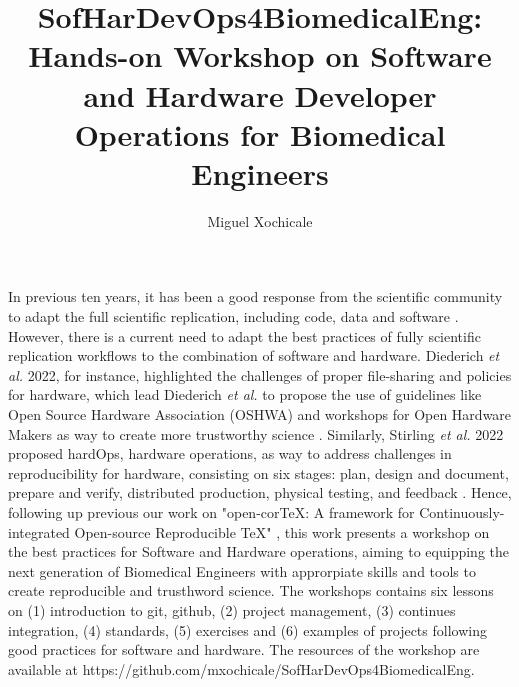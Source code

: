 \documentclass{article}
\title{
SofHarDevOps4BiomedicalEng: Hands-on Workshop on Software and Hardware Developer Operations for Biomedical Engineers %
}
\author{Miguel Xochicale}
\date{\DTMNow}
\begin{document}
\maketitle
In previous ten years, it has been a good response from the scientific community to adapt the full scientific replication, including code, data and software \cite{peng2011}. 
However, there is a current need to adapt the best practices of fully scientific replication workflows to the combination of software and hardware.
Diederich \textit{et al.} 2022, for instance, highlighted the challenges of proper file-sharing and policies for hardware, which lead Diederich \textit{et al.} to propose the use of guidelines like Open Source Hardware Association (OSHWA) and workshops for Open Hardware Makers as way to create more trustworthy science \cite{Diederich2022}.
Similarly, Stirling \textit{et al.} 2022 proposed hardOps, hardware operations, as way to address challenges in reproducibility for hardware, consisting on six stages: plan, design and document, prepare and verify, distributed production, physical testing, and feedback \cite{stirling2022}. 
Hence, following up previous our work on "open-corTeX: A framework for Continuously-integrated Open-source Reproducible TeX" \cite{xochicale2020}, this work presents a workshop on the best practices for Software and Hardware operations, aiming to equipping the next generation of Biomedical Engineers with approrpiate skills and tools to create reproducible and trusthword science.
The workshops contains six lessons on (1) introduction to git, github, (2) project management, (3) continues integration, (4) standards, (5) exercises and (6) examples of projects following good practices for software and hardware.
The resources of the workshop are available at https://github.com/mxochicale/SofHarDevOps4BiomedicalEng.

\newpage
%

\end{document}
